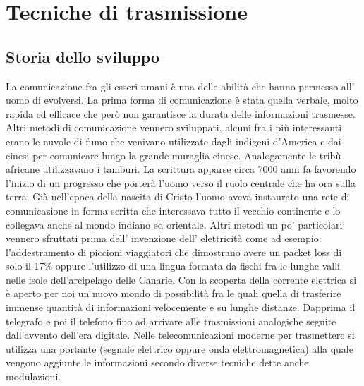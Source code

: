 \chapter{Tecniche di trasmissione}
\label{cha:intro}
\section{Storia dello sviluppo}
\label{sec:context}
 La comunicazione fra gli esseri umani è una delle abilità che hanno permesso all' uomo di evolversi. La prima forma di comunicazione è stata quella verbale, molto rapida ed efficace che però non garantisce la durata delle informazioni trasmesse. Altri metodi di comunicazione vennero sviluppati, alcuni fra i più interessanti erano le nuvole di fumo che venivano utilizzate dagli indigeni d'America e dai cinesi per comunicare lungo la grande muraglia cinese. Analogamente le tribù africane utilizzavano i tamburi. La scrittura apparse circa 7000 anni fa favorendo l'inizio di un progresso che porterà l'uomo verso il ruolo centrale che ha ora sulla terra. Già nell'epoca della nascita di Cristo l'uomo aveva instaurato una rete di comunicazione in forma scritta che interessava tutto il vecchio continente e lo collegava anche al mondo indiano ed orientale. Altri metodi un po' particolari vennero sfruttati prima dell' invenzione dell' elettricità come ad esempio: l'addestramento di piccioni viaggiatori  che dimostrano avere un packet loss di solo il 17\% oppure l'utilizzo di una lingua formata da fischi fra le lunghe valli nelle isole dell'arcipelago delle Canarie.
Con la scoperta della corrente elettrica si è aperto per noi un nuovo mondo di possibilità fra le quali quella di trasferire immense quantità di informazioni velocemente e su lunghe distanze. Dapprima il telegrafo e poi il telefono fino ad arrivare alle trasmissioni analogiche seguite dall'avvento dell'era digitale. Nelle telecomunicazioni moderne per trasmettere si utilizza una portante (segnale elettrico oppure onda elettromagnetica) alla quale vengono aggiunte le informazioni secondo diverse tecniche dette anche modulazioni.


